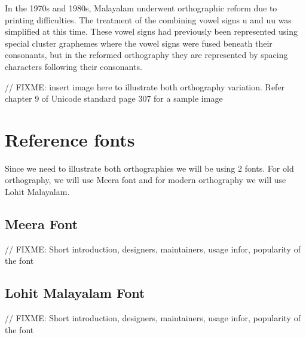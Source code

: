 In the 1970s and 1980s, Malayalam underwent orthographic reform due to printing difficulties. The treatment of the combining vowel signs u and uu was simplified at this time. These vowel signs had previously been represented using special cluster graphemes where the vowel signs were fused beneath their consonants, but in the reformed orthography they are represented by spacing characters following their consonants.

// FIXME: insert image here to illustrate both orthography variation. Refer chapter 9 of Unicode standard page 307 for a sample image

\section{Reference fonts}

Since we need to illustrate both orthographies we will be using 2 fonts. For old orthography, we will use Meera font and for modern orthography we will use Lohit Malayalam.

\subsection{Meera Font}
// FIXME: Short introduction, designers, maintainers, usage infor, popularity of the font

\subsection{Lohit Malayalam Font}
// FIXME: Short introduction, designers, maintainers, usage infor, popularity of the font

